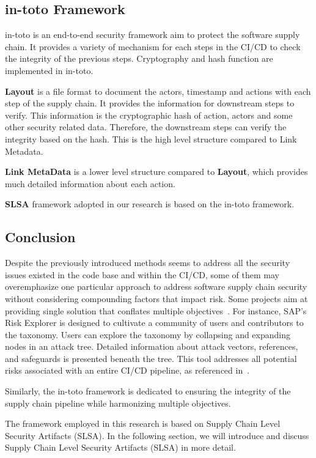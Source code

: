 \subsection{in-toto Framework}
in-toto is an end-to-end security framework aim to protect the software supply chain. It provides a variety
of mechanism for each steps in the CI/CD to check the integrity of the previous steps. Cryptography and hash 
function are implemented in in-toto.

\textbf{Layout} is a file format to document the actors, timestamp and actions with each step of the supply chain.
It provides the information for downstream steps to verify. This information is the cryptographic hash of action, actors and some other security
related data. Therefore, the downstream steps can verify the integrity based on the hash. This is the high level structure 
compared to Link Metadata.

\textbf{Link MetaData} is a lower level structure compared to \textbf{Layout}, which provides much detailed information about each action.

\textbf{SLSA} framework adopted in our research is based on the in-toto framework.

\subsection{Conclusion}
Despite the previously introduced methods seems to address all the security issues
existed in the code base and within the CI/CD, some of them may overemphasize one 
particular approach to address software supply chain security without considering 
compounding factors that impact risk.
Some projects aim at providing single solution that conﬂates multiple 
objectives~\cite{melara2022software}.
For instance, SAP's Risk Explorer is designed to cultivate a community of users 
and contributors to the taxonomy. Users can explore the taxonomy by collapsing and 
expanding nodes in an attack tree. Detailed information about attack vectors, 
references, and safeguards is presented beneath the tree. 
This tool addresses all potential risks associated with an entire CI/CD pipeline, 
as referenced in~\cite{ladisa2023journey}.

Similarly, the in-toto framework is dedicated to ensuring the integrity of the supply 
chain pipeline while harmonizing multiple objectives.

The framework employed in this research is based on Supply Chain Level Security 
Artifacts (SLSA). In the following section, we will introduce and discuss Supply Chain 
Level Security Artifacts (SLSA) in more detail.
